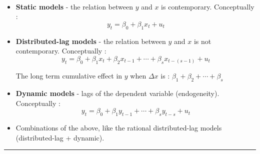 	\begin{f}{\ }
		

	\begin{itemize}[leftmargin=*]
		\item \textbf{Static models} - the relation between $y$ and $x$ is contemporary. Conceptually :
\[y_{t} = \beta_{0} + \beta_{1} x_{t} + u_{t}\]
		
		\item \textbf{Distributed-lag models} - the relation between $y$ and $x$ is not contemporary. Conceptually :
\[y_{t} = \beta_{0} + \beta_{1} x_{t} + \beta_{2} x_{t - 1} + \cdots + \beta_{s} x_{t - (s - 1)} + u_{t}\]
		
		The long term cumulative effect in $y$ when $\Delta x$ is :
			$\beta_{1} + \beta_{2} + \cdots + \beta_{s}$
		
		\item \textbf{Dynamic models} - lags of the dependent variable (endogeneity). Conceptually :
\[y_{t} = \beta_{0} + \beta_{1} y_{t - 1} + \cdots + \beta_{s} y_{t - s} + u_{t}\]
		
		\item Combinations of the above, like the rational distributed-lag models (distributed-lag + dynamic).
	\end{itemize}	

\end{f} 
 \hrule 
 

